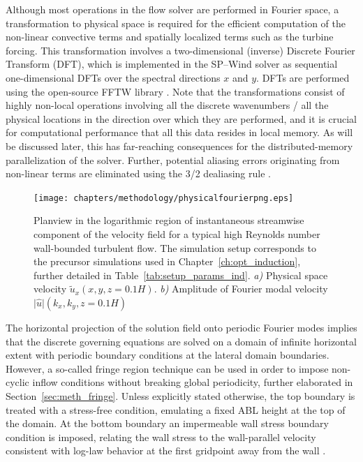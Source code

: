 Although most operations in the flow solver are performed in Fourier space, a transformation to physical space is required for the efficient computation of the non-linear convective terms and spatially localized terms such as the turbine forcing. This transformation involves a two-dimensional (inverse) Discrete Fourier Transform (DFT), which is implemented in the SP--Wind solver as sequential one-dimensional DFTs over the spectral directions $x$ and $y$. DFTs are performed using the open-source FFTW library \citep{frigo1997fastest}. Note that the transformations consist of highly non-local operations involving all the discrete wavenumbers / all the physical locations in the direction over which they are performed, and it is crucial for computational performance that all this data resides in local memory. As will be discussed later, this has far-reaching consequences for the distributed-memory parallelization of the solver. Further, potential aliasing errors originating from non-linear terms are eliminated using the 3/2 dealiasing rule \citep{canuto1988spectral}.

\begin{figure}
	\centering
	\texttt{[image: chapters/methodology/physicalfourierpng.eps]}
	\caption{Planview in the logarithmic region of instantaneous streamwise component of the velocity field for a typical high Reynolds number wall-bounded turbulent flow. The simulation setup corresponds to the precursor simulations used in Chapter~\ref{ch:opt_induction}, further detailed in Table~\ref{tab:setup_params_ind}. \emph{a)} Physical space velocity $\tilde{u}_x (x, y, z=0.1H)$. \emph{b)} Amplitude of Fourier modal velocity $\vert \hat{u} \vert (k_x, k_y, z=0.1H)$ \label{fig:physical_fourier}}
\end{figure}

The horizontal projection of the solution field onto periodic Fourier modes implies that the discrete governing equations are solved on a domain of infinite horizontal extent with periodic boundary conditions at the lateral domain boundaries. However, a so-called fringe region technique can be used in order to impose non-cyclic inflow conditions without breaking global periodicity, further elaborated in Section~\ref{sec:meth_fringe}. Unless explicitly stated otherwise, the top boundary is treated with a stress-free condition, emulating a fixed ABL height at the top of the domain. At the bottom boundary an impermeable wall stress boundary condition is imposed, relating the wall stress to the wall-parallel velocity consistent with log-law behavior at the first gridpoint away from the wall \citep{bou2005scale, calaf2010large}. 


